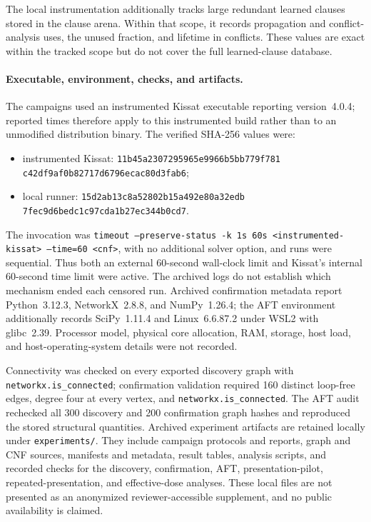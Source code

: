 \documentclass[11pt]{article}
\begin{document}
The local instrumentation additionally tracks large redundant learned clauses stored in the clause arena. Within that scope, it records propagation and conflict-analysis uses, the unused fraction, and lifetime in conflicts. These values are exact within the tracked scope but do not cover the full learned-clause database.

\paragraph{Executable, environment, checks, and artifacts.}
The campaigns used an instrumented Kissat executable reporting version~4.0.4; reported times therefore apply to this instrumented build rather than to an unmodified distribution binary. The verified SHA-256 values were:
\begin{itemize}[nosep,leftmargin=1.5em]
    \item instrumented Kissat: \texttt{11b45a2307295965e9966b5bb779f781}\\
    \texttt{c42df9af0b82717d6796ecac80d3fab6};
    \item local runner: \texttt{15d2ab13c8a52802b15a492e80a32edb}\\
    \texttt{7fec9d6bedc1c97cda1b27ec344b0cd7}.
\end{itemize}
The invocation was \texttt{timeout --preserve-status -k 1s 60s}\allowbreak\texttt{ <instrumented-kissat> --time=60 <cnf>}, with no additional solver option, and runs were sequential. Thus both an external 60-second wall-clock limit and Kissat's internal 60-second time limit were active. The archived logs do not establish which mechanism ended each censored run. Archived confirmation metadata report Python~3.12.3, NetworkX~2.8.8, and NumPy~1.26.4; the AFT environment additionally records SciPy~1.11.4 and Linux~6.6.87.2 under WSL2 with glibc~2.39. Processor model, physical core allocation, RAM, storage, host load, and host-operating-system details were not recorded.

Connectivity was checked on every exported discovery graph with \texttt{networkx.is\_connected}; confirmation validation required 160 distinct loop-free edges, degree four at every vertex, and \texttt{networkx.is\_connected}. The AFT audit rechecked all 300 discovery and 200 confirmation graph hashes and reproduced the stored structural quantities. Archived experiment artifacts are retained locally under \nolinkurl{experiments/}. They include campaign protocols and reports, graph and CNF sources, manifests and metadata, result tables, analysis scripts, and recorded checks for the discovery, confirmation, AFT, presentation-pilot, repeated-presentation, and effective-dose analyses. These local files are not presented as an anonymized reviewer-accessible supplement, and no public availability is claimed.
\end{document}
